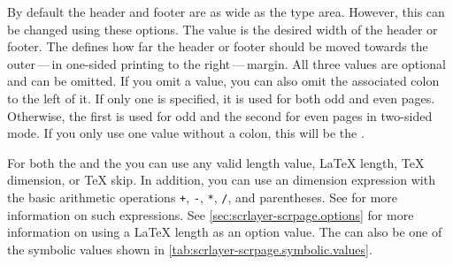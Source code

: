 \begin{Declaration}
\end{Declaration}
By default the header and footer are
as wide as the type area. However, this can be changed using these
\KOMAScript{} options. The value  is the desired width of the
header or footer. The  defines how far the header or footer
should be moved towards the outer\,---\,in one-sided printing to the
right\,---\,margin. All three
values are optional and can be omitted. If you omit a value, you can also omit
the associated colon to the left of it. If only one  is
specified, it is used for both odd and even pages. Otherwise, the first
 is used for odd and the second  for even pages in
two-sided mode. If you only use one value without a colon, this will be the
.

For both the  and the  you can use any valid length
value, \LaTeX{} length, \TeX{} dimension, or \TeX{} skip. In addition, you can
use an \eTeX{} dimension expression with the basic arithmetic operations
\texttt{+}, \texttt{-}, \texttt{*}, \texttt{/}, and parentheses. See
\cite[section~3.5]{manual:eTeX} for more information on such expressions. See
\autoref{sec:scrlayer-scrpage.options} for more information on using a
\LaTeX{} length as an option value. The  can also be one of the
symbolic values shown in \autoref{tab:scrlayer-scrpage.symbolic.values}.

